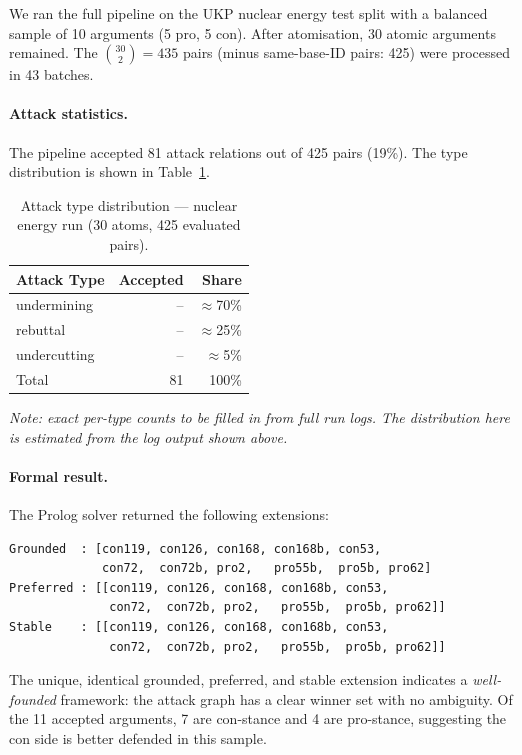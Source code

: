 \documentclass[runningheads]{llncs}
\begin{document}
We ran the full pipeline on the UKP nuclear energy test split with a
balanced sample of 10 arguments (5 pro, 5 con). After atomisation, 30
atomic arguments remained. The $\binom{30}{2} = 435$ pairs (minus
same-base-ID pairs: 425) were processed in 43 batches.

\paragraph{Attack statistics.} The pipeline accepted 81 attack relations
out of 425 pairs (19\%). The type distribution is shown in
Table~\ref{tab:types}.

\begin{table}[t]
\caption{Attack type distribution — nuclear energy run (30 atoms,
  425 evaluated pairs).}
\label{tab:types}
\centering
\begin{tabular}{lrr}
\toprule
Attack Type  & Accepted & Share \\
\midrule
undermining  & -- & $\approx$70\% \\
rebuttal     & -- & $\approx$25\% \\
undercutting & -- & $\approx$5\% \\
\midrule
Total        & 81 & 100\% \\
\bottomrule
\end{tabular}
\end{table}

\noindent\emph{Note: exact per-type counts to be filled in from full run logs.
The distribution here is estimated from the log output shown above.}

\paragraph{Formal result.} The Prolog solver returned the following
extensions:

\begin{lstlisting}[style=prolog]
Grounded  : [con119, con126, con168, con168b, con53,
             con72,  con72b, pro2,   pro55b,  pro5b, pro62]
Preferred : [[con119, con126, con168, con168b, con53,
              con72,  con72b, pro2,   pro55b,  pro5b, pro62]]
Stable    : [[con119, con126, con168, con168b, con53,
              con72,  con72b, pro2,   pro55b,  pro5b, pro62]]
\end{lstlisting}

The unique, identical grounded, preferred, and stable extension indicates
a \emph{well-founded} framework: the attack graph has a clear winner
set with no ambiguity. Of the 11 accepted arguments, 7 are con-stance
and 4 are pro-stance, suggesting the con side is better defended in
this sample.
\end{document}
